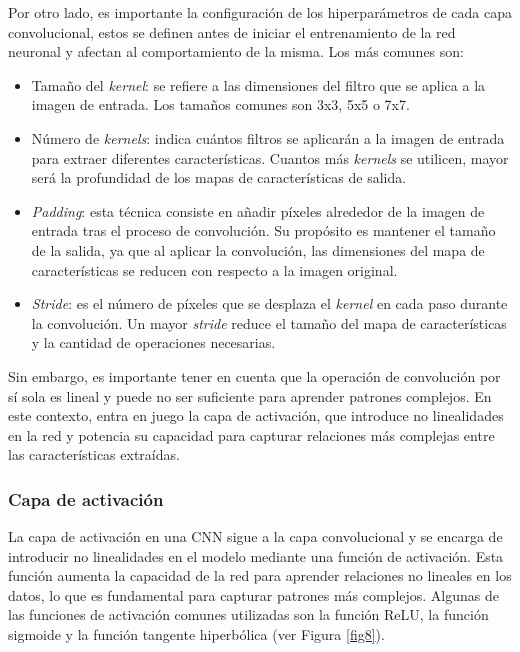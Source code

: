 Por otro lado, es importante la configuración de los hiperparámetros de cada capa convolucional, estos se definen antes de iniciar el entrenamiento de la red neuronal y afectan al comportamiento de la misma. Los más comunes son:
\begin{itemize}
	\item Tamaño del \textit{kernel}: se refiere a las dimensiones del filtro que se aplica a la imagen de entrada. Los tamaños comunes son 3x3, 5x5 o 7x7.
	\item Número de \textit{kernels}: indica cuántos filtros se aplicarán a la imagen de entrada para extraer diferentes características. Cuantos más \textit{kernels} se utilicen, mayor será la profundidad de los mapas de características de salida.
	\item \textit{Padding}: esta técnica consiste en añadir píxeles alrededor de la imagen de entrada tras el proceso de convolución. Su propósito es mantener el tamaño de la salida, ya que al aplicar la convolución, las dimensiones del mapa de características se reducen con respecto a la imagen original.
	\item \textit{Stride}: es el número de píxeles que se desplaza el \textit{kernel} en cada paso durante la convolución. Un mayor \textit{stride} reduce el tamaño del mapa de características y la cantidad de operaciones necesarias.
\end{itemize}

Sin embargo, es importante tener en cuenta que la operación de convolución por sí sola es lineal y puede no ser suficiente para aprender patrones complejos. En este contexto, entra en juego la capa de activación, que introduce no linealidades en la red y potencia su capacidad para capturar relaciones más complejas entre las características extraídas.

\subsubsection*{Capa de activación}

La capa de activación en una CNN sigue a la capa convolucional y se encarga de introducir no linealidades en el modelo mediante una función de activación.
Esta función aumenta la capacidad de la red para aprender relaciones no lineales en los datos, lo que es fundamental para capturar patrones más complejos. Algunas de las funciones de activación comunes utilizadas son la función ReLU, la función sigmoide y la función tangente hiperbólica (ver Figura \ref{fig8}).

